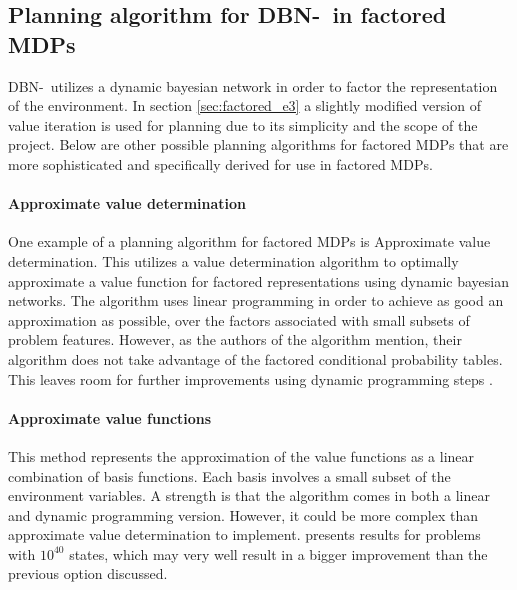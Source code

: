 \subsection{Planning algorithm for DBN-\etre\ in factored MDPs}
\label{sec:better_planing_algos}

  DBN-\etre\ utilizes a dynamic
bayesian network in order to factor the representation of the environment. In
section \ref{sec:factored_e3} a slightly modified version of value iteration is
used for planning due to its simplicity and the scope of the project. Below are other
possible planning algorithms for factored MDPs that are more sophisticated and
specifically derived for use in factored MDPs.

\paragraph{Approximate value determination}

One example of a planning algorithm for factored MDPs is Approximate value determination. 
This utilizes a value determination algorithm to optimally approximate a value
function for factored representations using dynamic bayesian networks. The
algorithm uses linear programming in order to achieve as good an approximation
as possible, over the factors associated with small subsets of problem
features. However, as the authors of the algorithm mention, their algorithm
does not take advantage of the factored conditional probability tables. This
leaves room for further improvements using dynamic programming steps
\parencite{koller1999computing}.

\paragraph{Approximate value functions}

This method represents the approximation of the value functions as a linear
combination of basis functions. Each basis involves a small subset of the
environment variables. A strength is that the algorithm comes in both a linear
and dynamic programming version. However, it could be more complex than approximate
value determination to implement. \textcite{guestrin2003efficient} presents
results for problems with $10^{40}$ states, which may very well result in a
bigger improvement than the previous option discussed.
